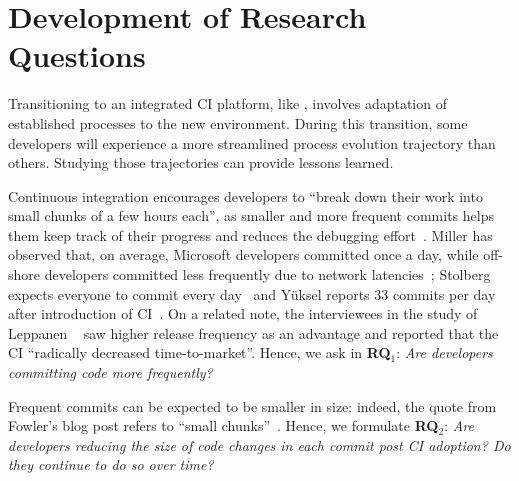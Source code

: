 
\section{Development of Research Questions}
\label{sec:background}

Transitioning to an integrated CI platform, like \Tvi, involves adaptation 
of established processes to the new environment. 
During this transition, some developers will experience a more streamlined 
process evolution trajectory than others. 
Studying those trajectories can provide lessons learned.


%


Continuous integration encourages developers to ``break down their work 
into small chunks of a few hours each'', as smaller and more frequent commits 
helps them keep track of their progress and reduces the debugging effort~\cite{Fowler,Duvall}. 
Miller has observed that, on average, Microsoft developers 
committed once a day, while off-shore developers committed less frequently 
due to network latencies~\cite{Miller}; Stolberg expects everyone to commit every 
day~\cite{Stolberg} and Y\"{u}ksel reports 33 commits per day after introduction 
of CI~\cite{Yuksel}. On a related note, the interviewees in the study of 
Leppanen \etal~\cite{Leppanen2015} saw higher release frequency as an
advantage and reported that the CI ``radically decreased time-to-market''. 
Hence, we ask in \textbf{RQ$_1$}: 
\emph{Are developers committing code more frequently?}

Frequent commits can be expected to be smaller in size: indeed, 
 the quote from Fowler's blog post refers to ``small chunks''~\cite{Fowler,Duvall}.
Hence, we formulate \textbf{RQ$_2$}: 
\emph{Are developers reducing the size of code changes in each commit 
post CI adoption? 
Do they continue to do so over time?}

